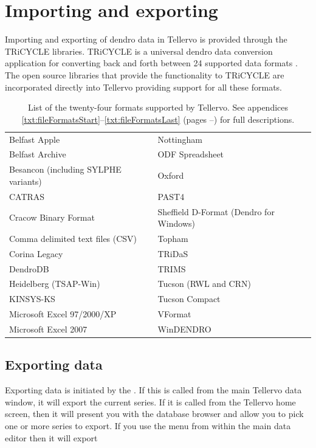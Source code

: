 \chapter{Importing and exporting}
\label{txt:importExport}
Importing and exporting of dendro data in Tellervo is provided through the TRiCYCLE libraries.  TRiCYCLE is a universal dendro data conversion application for converting back and forth between 24 supported data formats \citep{tricycle}.  The open source libraries that provide the functionality to TRiCYCLE are incorporated directly into Tellervo providing support for all these formats.  

\begin{table}[htbp]
\centering
\label{txt:formatList}
\begin{tabular*}{0.8\textwidth}{ll}
\toprule
Belfast Apple & Nottingham \\
Belfast Archive & ODF Spreadsheet \\
Besancon (including SYLPHE variants) &   Oxford\\
CATRAS & PAST4\\
Cracow Binary Format & Sheffield D-Format (Dendro for Windows)\\
Comma delimited text files (CSV) &  Topham \\
Corina Legacy &  TRiDaS\\
DendroDB & TRIMS\\
Heidelberg (TSAP-Win) &  Tucson (RWL and CRN)\\
KINSYS-KS & Tucson Compact\\
Microsoft Excel 97/2000/XP & VFormat \\
Microsoft Excel 2007 & WinDENDRO\\
\bottomrule
\end{tabular*}
\caption{List of the twenty-four formats supported by Tellervo. See appendices \ref{txt:fileFormatsStart}--\ref{txt:fileFormatsLast} (pages \pageref{txt:fileFormatsStart}--\pageref{txt:fileFormatsEnd}) for full descriptions.}
\end{table}



\section{Exporting data}
Exporting data is initiated by the .  If this is called from the main Tellervo data window, it will export the current series.  If it is called from the Tellervo home screen, then it will present you with the database browser and allow you to pick one or more series to export.  If you use the menu from within the main data editor then it will export 

